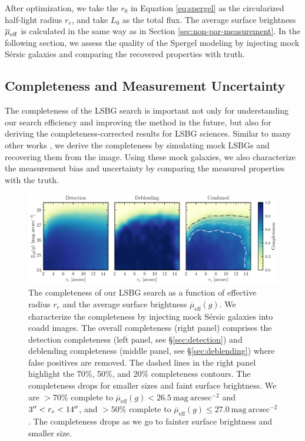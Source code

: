 \documentclass[twocolumn,astrosymb,twocolappendix]{aastex631}
\newcommand{\sbunit}{\mathrm{mag\ arcsec}^{-2}}
\newcommand{\sbeff}{\overline{\mu}_{\mathrm{eff}}(g)}
\newcommand{\jiaxuan}[1]{\textcolor{orange}{\textbf{Jiaxuan: #1}}}
\newcommand{\sersic}{S\'ersic}
\begin{document}
\begin{CJK*}{UTF8}{gbsn}
After optimization, we take the $r_0$ in Equation \eqref{eq:spergel} as the circularized half-light radius $r_e$, and take $L_0$ as the total flux. The average surface brightness $\overline{\mu}_{\rm eff}$ is calculated in the same way as in Section \ref{sec:non-par-measurement}. In the following section, we assess the quality of the Spergel modeling by injecting mock \sersic{} galaxies and comparing the recovered properties with truth. 


\subsection{Completeness and Measurement Uncertainty}\label{sec:comp_meas}
The completeness of the LSBG search is important not only for understanding our search efficiency and improving the method in the future, but also for deriving the completeness-corrected results for LSBG sciences. Similar to many other works \citep[e.g.,][]{vdBurg2017,Zaritsky2021,CarlstenELVES2022,Greene2022}, we derive the completeness by simulating mock LSBGs and recovering them from the image. Using these mock galaxies, we also characterize the measurement bias and uncertainty by comparing the measured properties with the truth. 

\begin{figure}
	\vbox{ 
		\centering
		\includegraphics[width=1\linewidth]{completeness.pdf}
	}
	\caption{The completeness of our LSBG search as a function of effective radius $r_e$ and the average surface brightness $\sbeff$. We characterize the completeness by injecting mock \sersic{} galaxies into coadd images. The overall completeness (right panel) comprises the detection completeness (left panel, see \S \ref{sec:detection}) and deblending completeness (middle panel, see \S \ref{sec:deblending}) where false positives are removed. The dashed lines in the right panel highlight the 70\%, 50\%, and 20\% completeness contours. The completeness drops for smaller sizes and faint surface brightness. We are $>70\%$ complete to $\sbeff < 26.5\ \sbunit$ and $3\mbox{$^{\prime\prime}$} < r_e < 14\mbox{$^{\prime\prime}$}$, and $>50\%$ complete to $\sbeff \leqslant 27.0\ \sbunit$. The completeness drops as we go to fainter surface brightness and smaller size. 
	}
	\label{fig:completeness}
\end{figure}

\end{CJK*}
\end{document}
